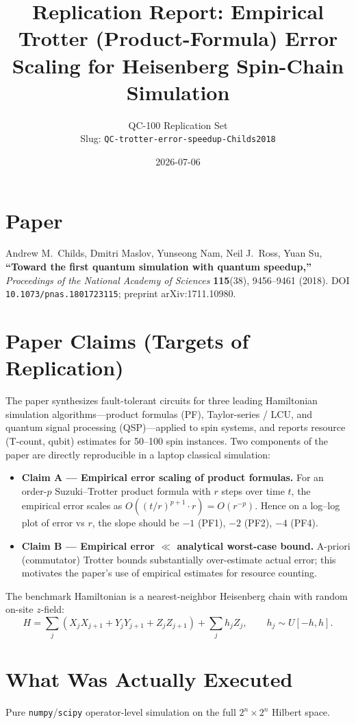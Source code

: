 \documentclass[11pt]{article}
\title{Replication Report: Empirical Trotter (Product-Formula) Error
Scaling for Heisenberg Spin-Chain Simulation}
\author{QC-100 Replication Set \\ Slug: \texttt{QC-trotter-error-speedup-Childs2018}}
\date{2026-07-06}
\begin{document}
\maketitle

\section{Paper}
Andrew M.\ Childs, Dmitri Maslov, Yunseong Nam, Neil J.\ Ross, Yuan Su,
\textbf{``Toward the first quantum simulation with quantum speedup,''}
\emph{Proceedings of the National Academy of Sciences} \textbf{115}(38),
9456--9461 (2018). DOI \texttt{10.1073/pnas.1801723115}; preprint
arXiv:1711.10980.

\section{Paper Claims (Targets of Replication)}
The paper synthesizes fault-tolerant circuits for three leading Hamiltonian
simulation algorithms---product formulas (PF), Taylor-series / LCU, and
quantum signal processing (QSP)---applied to spin systems, and reports
resource (T-count, qubit) estimates for 50--100 spin instances. Two
components of the paper are directly reproducible in a laptop classical
simulation:

\begin{itemize}
  \item \textbf{Claim A --- Empirical error scaling of product formulas.} For
  an order-$p$ Suzuki--Trotter product formula with $r$ steps over time $t$,
  the empirical error scales as $O((t/r)^{p+1}\cdot r)=O(r^{-p})$. Hence on
  a log--log plot of error vs $r$, the slope should be $-1$ (PF1), $-2$
  (PF2), $-4$ (PF4).
  \item \textbf{Claim B --- Empirical error $\ll$ analytical worst-case
  bound.} A-priori (commutator) Trotter bounds substantially over-estimate
  actual error; this motivates the paper's use of empirical estimates for
  resource counting.
\end{itemize}

The benchmark Hamiltonian is a nearest-neighbor Heisenberg chain with
random on-site $z$-field:
\[
H=\sum_j\left(X_jX_{j+1}+Y_jY_{j+1}+Z_jZ_{j+1}\right)+\sum_j h_j Z_j,
\qquad h_j\sim U[-h,h].
\]

\section{What Was Actually Executed}
Pure \texttt{numpy}/\texttt{scipy} operator-level simulation on the full
$2^n\times 2^n$ Hilbert space.
\end{document}
